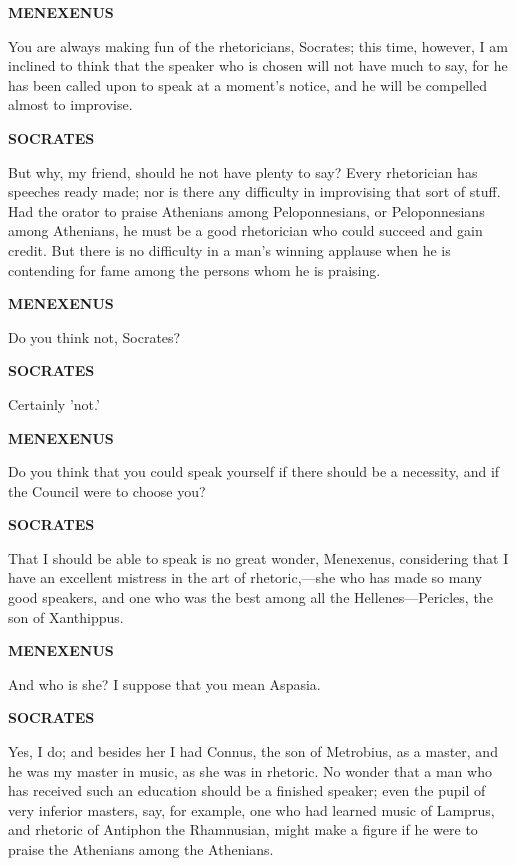 \documentclass[11pt,letter]{article}
\begin{document}
\par \textbf{MENEXENUS}
\par   You are always making fun of the rhetoricians, Socrates; this time, however, I am inclined to think that the speaker who is chosen will not have much to say, for he has been called upon to speak at a moment's notice, and he will be compelled almost to improvise.

\par \textbf{SOCRATES}
\par   But why, my friend, should he not have plenty to say? Every rhetorician has speeches ready made; nor is there any difficulty in improvising that sort of stuff. Had the orator to praise Athenians among Peloponnesians, or Peloponnesians among Athenians, he must be a good rhetorician who could succeed and gain credit. But there is no difficulty in a man's winning applause when he is contending for fame among the persons whom he is praising.

\par \textbf{MENEXENUS}
\par   Do you think not, Socrates?

\par \textbf{SOCRATES}
\par   Certainly 'not.'

\par \textbf{MENEXENUS}
\par   Do you think that you could speak yourself if there should be a necessity, and if the Council were to choose you?

\par \textbf{SOCRATES}
\par   That I should be able to speak is no great wonder, Menexenus, considering that I have an excellent mistress in the art of rhetoric,—she who has made so many good speakers, and one who was the best among all the Hellenes—Pericles, the son of Xanthippus.

\par \textbf{MENEXENUS}
\par   And who is she? I suppose that you mean Aspasia.

\par \textbf{SOCRATES}
\par   Yes, I do; and besides her I had Connus, the son of Metrobius, as a master, and he was my master in music, as she was in rhetoric. No wonder that a man who has received such an education should be a finished speaker; even the pupil of very inferior masters, say, for example, one who had learned music of Lamprus, and rhetoric of Antiphon the Rhamnusian, might make a figure if he were to praise the Athenians among the Athenians.
\end{document}
